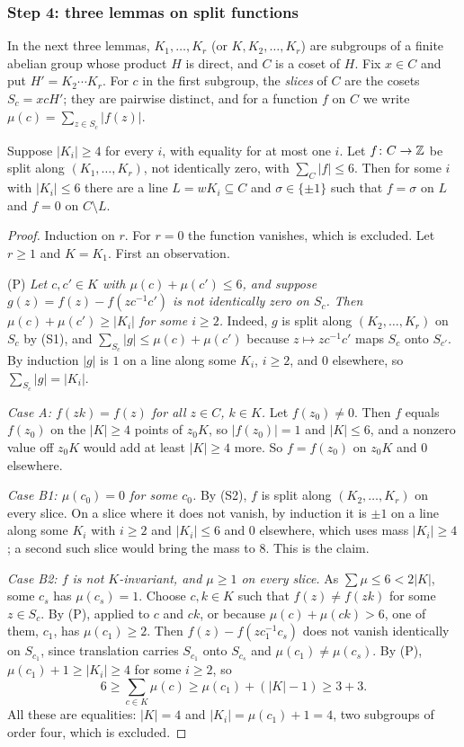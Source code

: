 \subsubsection*{Step 4: three lemmas on split functions}
In the next three lemmas, $K_{1},\dots,K_{r}$ (or $K,K_{2},\dots,K_{r}$) are
subgroups of a finite abelian group whose product $H$ is direct, and $C$ is a
coset of $H$. Fix $x\in C$ and put $H'=K_{2}\cdots K_{r}$. For $c$ in the
first subgroup, the \emph{slices} of $C$ are the cosets $S_{c}=xcH'$; they are
pairwise distinct, and for a function $f$ on $C$ we write
$\mu(c)=\sum_{z\in S_{c}}|f(z)|$.

\begin{lemma}[grid]\label{lem:grid}
Suppose $|K_{i}|\ge4$ for every $i$, with equality for at most one $i$. Let
$f\colon C\to\mathbb{Z}$ be split along $(K_{1},\dots,K_{r})$, not identically zero,
with $\sum_{C}|f|\le6$. Then for some $i$ with $|K_{i}|\le6$ there are a line
$L=wK_{i}\subseteq C$ and $\sigma\in\{\pm1\}$ such that $f=\sigma$ on $L$ and
$f=0$ on $C\setminus L$.
\end{lemma}

\begin{proof}
Induction on $r$. For $r=0$ the function vanishes, which is excluded. Let
$r\ge1$ and $K=K_{1}$. First an observation.

(P) \emph{Let $c,c'\in K$ with $\mu(c)+\mu(c')\le6$, and suppose
$g(z)=f(z)-f(zc^{-1}c')$ is not identically zero on $S_{c}$. Then
$\mu(c)+\mu(c')\ge|K_{i}|$ for some $i\ge2$.} Indeed, $g$ is split along
$(K_{2},\dots,K_{r})$ on $S_{c}$ by (S1), and $\sum_{S_{c}}|g|\le\mu(c)+
\mu(c')$ because $z\mapsto zc^{-1}c'$ maps $S_{c}$ onto $S_{c'}$. By
induction $|g|$ is $1$ on a line along some $K_{i}$, $i\ge2$, and $0$
elsewhere, so $\sum_{S_{c}}|g|=|K_{i}|$.

\emph{Case A: $f(zk)=f(z)$ for all $z\in C$, $k\in K$.} Let $f(z_{0})\ne0$.
Then $f$ equals $f(z_{0})$ on the $|K|\ge4$ points of $z_{0}K$, so
$|f(z_{0})|=1$ and $|K|\le6$, and a nonzero value off $z_{0}K$ would add at
least $|K|\ge4$ more. So $f=f(z_{0})$ on $z_{0}K$ and $0$ elsewhere.

\emph{Case B1: $\mu(c_{0})=0$ for some $c_{0}$.} By (S2), $f$ is split along
$(K_{2},\dots,K_{r})$ on every slice. On a slice where it does not vanish, by
induction it is $\pm1$ on a line along some $K_{i}$ with $i\ge2$ and
$|K_{i}|\le6$ and $0$ elsewhere, which uses mass $|K_{i}|\ge4$; a second such
slice would bring the mass to $8$. This is the claim.

\emph{Case B2: $f$ is not $K$-invariant, and $\mu\ge1$ on every slice.} As
$\sum\mu\le6<2|K|$, some $c_{s}$ has $\mu(c_{s})=1$. Choose $c,k\in K$ such
that $f(z)\ne f(zk)$ for some $z\in S_{c}$. By (P), applied to $c$ and $ck$,
or because $\mu(c)+\mu(ck)>6$, one of them, $c_{1}$, has $\mu(c_{1})\ge2$.
Then $f(z)-f(zc_{1}^{-1}c_{s})$ does not vanish identically on $S_{c_{1}}$,
since translation carries $S_{c_{1}}$ onto $S_{c_{s}}$ and $\mu(c_{1})\ne
\mu(c_{s})$. By (P), $\mu(c_{1})+1\ge|K_{i}|\ge4$ for some $i\ge2$, so
\[
  6\ge\sum_{c\in K}\mu(c)\ge\mu(c_{1})+(|K|-1)\ge3+3.
\]
All these are equalities: $|K|=4$ and $|K_{i}|=\mu(c_{1})+1=4$, two
subgroups of order four, which is excluded.
\end{proof}

